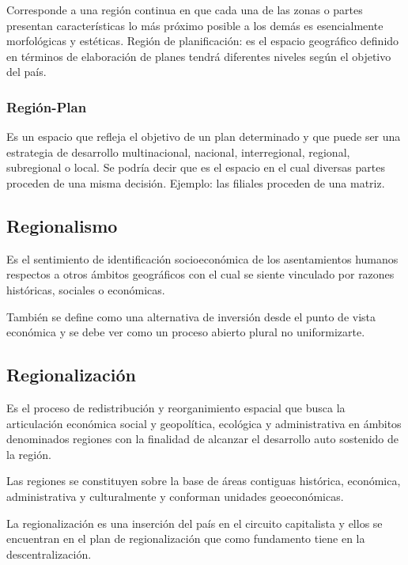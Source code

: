 \documentclass[
  letterpaper,
  DIV=11,
  numbers=noendperiod]{scrartcl}
\begin{document}
Corresponde a una región continua en que cada una de las zonas o partes
presentan características lo más próximo posible a los demás es
esencialmente morfológicas y estéticas. Región de planificación: es el
espacio geográfico definido en términos de elaboración de planes tendrá
diferentes niveles según el objetivo del país.

\hypertarget{regiuxf3n-plan}{%
\subsubsection{Región-Plan}\label{regiuxf3n-plan}}

Es un espacio que refleja el objetivo de un plan determinado y que puede
ser una estrategia de desarrollo multinacional, nacional, interregional,
regional, subregional o local. Se podría decir que es el espacio en el
cual diversas partes proceden de una misma decisión. Ejemplo: las
filiales proceden de una matriz.

\hypertarget{regionalismo}{%
\subsection{Regionalismo}\label{regionalismo}}

Es el sentimiento de identificación socioeconómica de los asentamientos
humanos respectos a otros ámbitos geográficos con el cual se siente
vinculado por razones históricas, sociales o económicas.

También se define como una alternativa de inversión desde el punto de
vista económica y se debe ver como un proceso abierto plural no
uniformizarte.

\hypertarget{regionalizaciuxf3n}{%
\subsection{Regionalización}\label{regionalizaciuxf3n}}

Es el proceso de redistribución y reorganimiento espacial que busca la
articulación económica social y geopolítica, ecológica y administrativa
en ámbitos denominados regiones con la finalidad de alcanzar el
desarrollo auto sostenido de la región.

Las regiones se constituyen sobre la base de áreas contiguas histórica,
económica, administrativa y culturalmente y conforman unidades
geoeconómicas.

La regionalización es una inserción del país en el circuito capitalista
y ellos se encuentran en el plan de regionalización que como fundamento
tiene en la descentralización.
\end{document}
